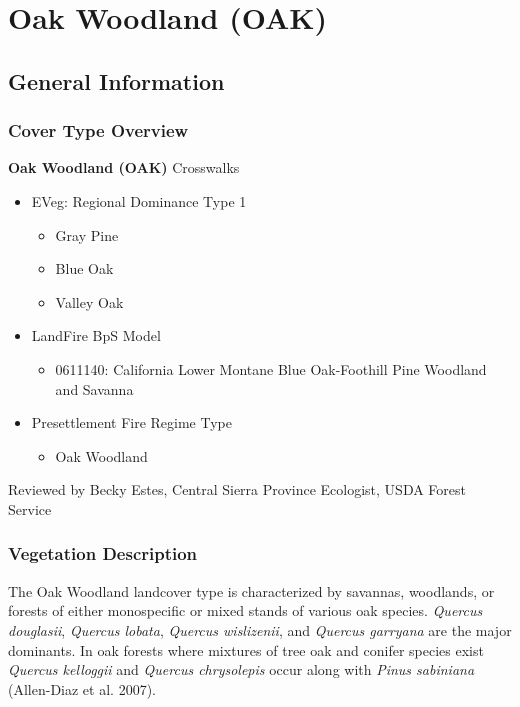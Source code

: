 \newpage
\section{Oak Woodland (OAK)}
\label{oak-description}

\subsection*{General Information}

\subsubsection{Cover Type Overview}

\textbf{Oak Woodland (OAK)} 
\newline
Crosswalks
\begin{itemize}
	\item EVeg: Regional Dominance Type 1
	\begin{itemize}
		\item Gray Pine
		\item Blue Oak
		\item Valley Oak
	\end{itemize}

	\item LandFire BpS Model
	\begin{itemize}
		\item 0611140: California Lower Montane Blue Oak-Foothill Pine Woodland and Savanna
	\end{itemize}

	\item Presettlement Fire Regime Type
	\begin{itemize}
		\item Oak Woodland
	\end{itemize}
\end{itemize}

\noindent Reviewed by Becky Estes, Central Sierra Province Ecologist, USDA Forest Service

\subsubsection{Vegetation Description}
The Oak Woodland landcover type is characterized by savannas, woodlands, or forests of either monospecific or mixed stands of various oak species. \emph{Quercus douglasii}, \emph{Quercus lobata}, \emph{Quercus wislizenii}, and \emph{Quercus garryana} are the major dominants. In oak forests where mixtures of tree oak and conifer species exist \emph{Quercus kelloggii} and \emph{Quercus chrysolepis} occur along with \emph{Pinus sabiniana} (Allen-Diaz et al. 2007). 

